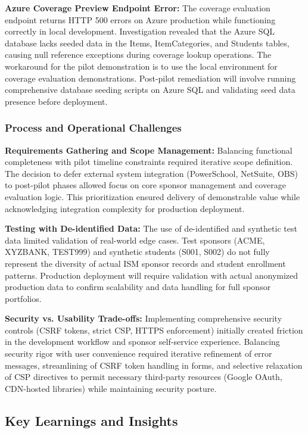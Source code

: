 \textbf{Azure Coverage Preview Endpoint Error:} The coverage evaluation endpoint returns HTTP 500 errors on Azure production while functioning correctly in local development. Investigation revealed that the Azure SQL database lacks seeded data in the Items, ItemCategories, and Students tables, causing null reference exceptions during coverage lookup operations. The workaround for the pilot demonstration is to use the local environment for coverage evaluation demonstrations. Post-pilot remediation will involve running comprehensive database seeding scripts on Azure SQL and validating seed data presence before deployment.

\subsubsection{Process and Operational Challenges}

\textbf{Requirements Gathering and Scope Management:} Balancing functional completeness with pilot timeline constraints required iterative scope definition. The decision to defer external system integration (PowerSchool, NetSuite, OBS) to post-pilot phases allowed focus on core sponsor management and coverage evaluation logic. This prioritization ensured delivery of demonstrable value while acknowledging integration complexity for production deployment.

\textbf{Testing with De-identified Data:} The use of de-identified and synthetic test data limited validation of real-world edge cases. Test sponsors (ACME, XYZBANK, TEST999) and synthetic students (S001, S002) do not fully represent the diversity of actual ISM sponsor records and student enrollment patterns. Production deployment will require validation with actual anonymized production data to confirm scalability and data handling for full sponsor portfolios.

\textbf{Security vs. Usability Trade-offs:} Implementing comprehensive security controls (CSRF tokens, strict CSP, HTTPS enforcement) initially created friction in the development workflow and sponsor self-service experience. Balancing security rigor with user convenience required iterative refinement of error messages, streamlining of CSRF token handling in forms, and selective relaxation of CSP directives to permit necessary third-party resources (Google OAuth, CDN-hosted libraries) while maintaining security posture.

\subsection{Key Learnings and Insights}

